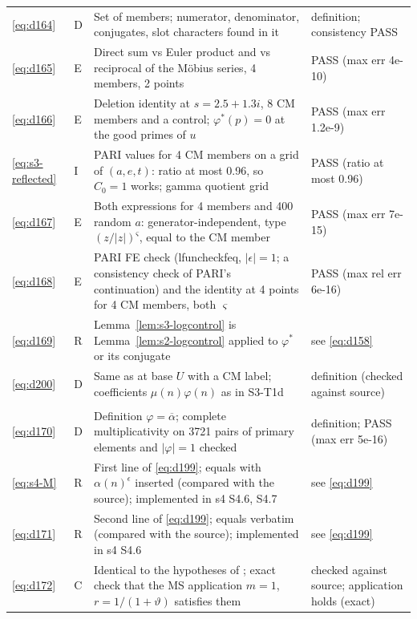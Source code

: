 \documentclass[11pt]{article}
\numberwithin{equation}{section}
\begin{document}
\begin{longtable}{@{}>{\raggedright\arraybackslash}p{1.2cm}>{\centering\arraybackslash}p{0.7cm}>{\raggedright\arraybackslash}p{9.05cm}>{\raggedright\arraybackslash}p{4.3cm}@{}}
\eqref{eq:d164} & D & Set of members; numerator, denominator, conjugates, slot characters found in it & definition; consistency PASS\\
\eqref{eq:d165} & E & Direct sum vs Euler product and vs reciprocal of the M\"obius series, 4 members, 2 points & PASS (max err 4e-10)\\
\eqref{eq:d166} & E & Deletion identity at $s=2.5+1.3i$, 8 CM members and a control; $\varphi^*(p)=0$ at the good primes of $u$ & PASS (max err 1.2e-9)\\
\eqref{eq:s3-reflected} & I & PARI values for 4 CM members on a grid of $(a,e,t)$: ratio at most 0.96, so $C_0=1$ works; gamma quotient grid & PASS (ratio at most 0.96)\\
\eqref{eq:d167} & E & Both expressions for 4 members and 400 random $a$: generator-independent, type $(z/|z|)^\varsigma$, equal to the CM member & PASS (max err 7e-15)\\
\eqref{eq:d168} & E & PARI FE check (lfuncheckfeq, $|\epsilon|=1$; a consistency check of PARI's continuation) and the identity at 4 points for 4 CM members, both $\varsigma$ & PASS (max rel err 6e-16)\\
\eqref{eq:d169} & R & Lemma~\ref{lem:s3-logcontrol} is Lemma~\ref{lem:s2-logcontrol} applied to $\varphi^*$ or its conjugate & see \eqref{eq:d158}\\
\eqref{eq:d200} & D & Same as \cite[eqs.~(4.2), (4.1)]{OAI78} at base $U$ with a CM label; coefficients $\mu(n)\varphi(n)$ as in S3-T1d & definition (checked against source)\\
\multicolumn{4}{@{}l}{\emph{Appendix~E}}\\
\eqref{eq:d170} & D & Definition $\varphi=\overline\alpha$; complete multiplicativity on 3721 pairs of primary elements and $|\varphi|=1$ checked & definition; PASS (max err 5e-16)\\
\eqref{eq:s4-M} & R & First line of \eqref{eq:d199}; equals \cite{OAI78} with $\alpha(n)^\epsilon$ inserted (compared with the source); implemented in s4 S4.6, S4.7 & see \eqref{eq:d199}\\
\eqref{eq:d171} & R & Second line of \eqref{eq:d199}; equals \cite{OAI78} verbatim (compared with the source); implemented in s4 S4.6 & see \eqref{eq:d199}\\
\eqref{eq:d172} & C & Identical to the hypotheses of \cite[Lemma~17.1]{OAI78}; exact check that the MS application $m=1$, $r=1/(1+\vartheta)$ satisfies them & checked against source; application holds (exact)\\

\end{longtable}
\end{document}
